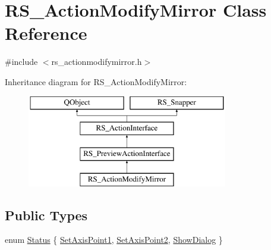\hypertarget{classRS__ActionModifyMirror}{\section{R\-S\-\_\-\-Action\-Modify\-Mirror Class Reference}
\label{classRS__ActionModifyMirror}
}


{\ttfamily \#include $<$rs\-\_\-actionmodifymirror.\-h$>$}

Inheritance diagram for R\-S\-\_\-\-Action\-Modify\-Mirror\-:\begin{figure}[H]
\begin{center}
\leavevmode
\includegraphics[height=4.000000cm]{classRS__ActionModifyMirror}
\end{center}
\end{figure}
\subsection*{Public Types}
\begin{DoxyCompactItemize}
\item 
enum \hyperlink{classRS__ActionModifyMirror_a2b0598792e8e2cb2e7e5a516be92853c}{Status} \{ \hyperlink{classRS__ActionModifyMirror_a2b0598792e8e2cb2e7e5a516be92853ca73fc5264b883b83e08103646079d7ae2}{Set\-Axis\-Point1}, 
\hyperlink{classRS__ActionModifyMirror_a2b0598792e8e2cb2e7e5a516be92853ca6bb4f461720624a406304f8287672814}{Set\-Axis\-Point2}, 
\hyperlink{classRS__ActionModifyMirror_a2b0598792e8e2cb2e7e5a516be92853ca9383e8647bf56681cbb2f74bff9edef7}{Show\-Dialog}
 \}
\end{DoxyCompactItemize}
